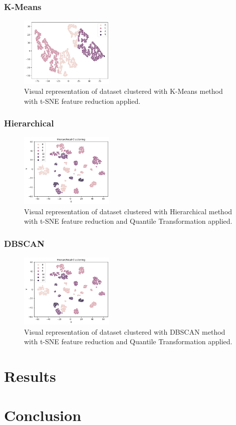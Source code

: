 \documentclass[twocolumn]{article}
\begin{document}
\subsubsection{K-Means}

\begin{figure}[H]
    \centering
    \includegraphics[width=0.4\textwidth]{images/kmeans.png}
    \caption{Visual representation of dataset clustered with K-Means method with t-SNE feature reduction applied.}
\end{figure}

\subsubsection{Hierarchical}

\begin{figure}[H]
    \centering
    \includegraphics[width=0.4\textwidth]{images/hierarchical.png}
    \caption{Visual representation of dataset clustered with Hierarchical method with t-SNE feature reduction and Quantile Transformation applied.}
\end{figure}

\subsubsection{DBSCAN}

\begin{figure}[H]
    \centering
    \includegraphics[width=0.4\textwidth]{images/hierarchical.png}
    \caption{Visual representation of dataset clustered with DBSCAN method with t-SNE feature reduction and Quantile Transformation applied.}
\end{figure}
\section{Results}
\section{Conclusion}

\pagebreak

\twocolumn[
\begin{@twocolumnfalse}
\printbibliography
\end{@twocolumnfalse}
]
\end{document}
